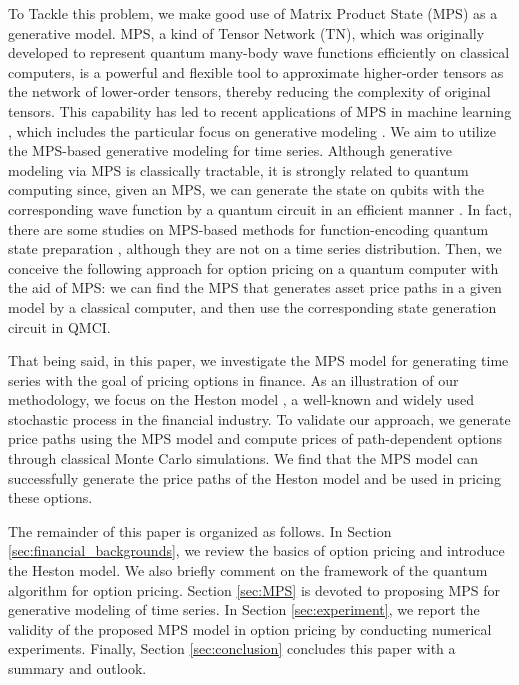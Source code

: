 {To Tackle this problem, we make good use of Matrix Product State (MPS) as a generative model.
MPS, a kind of Tensor Network (TN), which was originally developed to represent quantum many-body wave functions efficiently on classical computers, is a powerful and flexible tool to approximate higher-order tensors as the network of lower-order tensors, thereby reducing the complexity of original tensors.
This capability has led to recent applications of MPS in machine learning \cite{novikov2016exponential,stoudenmire2016supervised,huggins2019towards}, which includes the particular focus on generative modeling \cite{han2018unsupervised,cheng2019tree,liu2023tensor}.
We aim to utilize the MPS-based generative modeling for time series.
Although generative modeling via MPS is classically tractable, it is strongly related to quantum computing since, given an MPS, we can generate the state on qubits with the corresponding wave function by a quantum circuit in an efficient manner \cite{ran2020encoding,rudolph2022synergy,rudolph2023decomposition}.
In fact, there are some studies on MPS-based methods for function-encoding quantum state preparation \cite{GarciaRipoll2021quantuminspired,Holmes2020}, although they are not on a time series distribution.
Then, we conceive the following approach for option pricing on a quantum computer with the aid of MPS: we can find the MPS that generates asset price paths in a given model by a classical computer, and then use the corresponding state generation circuit in QMCI.

That being said, in this paper, we investigate the MPS model for generating time series with the goal of pricing options in finance. 
As an illustration of our methodology, we focus on the Heston model \cite{heston1993closed}, a well-known and widely used stochastic process in the financial industry.
To validate our approach, we generate price paths using the MPS model and compute prices of path-dependent options through classical Monte Carlo simulations.
We find that the MPS model can successfully generate the price paths of the Heston model and be used in pricing these options.

The remainder of this paper is organized as follows.
In Section \ref{sec:financial_backgrounds}, we review the basics of option pricing and introduce the Heston model. We also briefly comment on the framework of the quantum algorithm for option pricing.
Section \ref{sec:MPS} is devoted to proposing MPS for generative modeling of time series.
In Section \ref{sec:experiment}, we report the validity of the proposed MPS model in option pricing by conducting numerical experiments.
Finally, Section \ref{sec:conclusion} concludes this paper with a summary and outlook.




}

